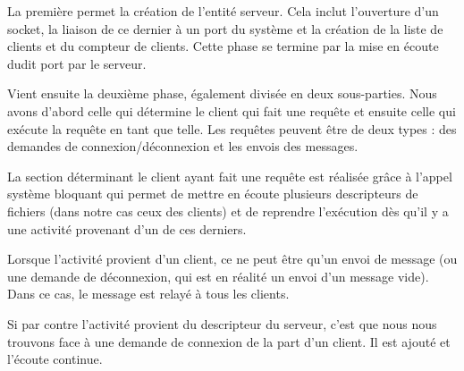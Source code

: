 La première permet la création de l'entité serveur. Cela
inclut l'ouverture d'un socket, la liaison de ce dernier à
un port du système et la création de la liste de clients et du
compteur de clients. Cette phase se termine par la mise en
écoute dudit port par le serveur.

Vient ensuite la deuxième phase, également divisée en deux
sous-parties. Nous avons d'abord celle qui détermine le
client qui fait une requête et ensuite celle qui exécute la requête
en tant que telle. Les requêtes peuvent être de deux types :
des demandes de connexion/déconnexion et les envois des
messages.

La section déterminant le client ayant fait une requête est
réalisée grâce à l'appel système bloquant \verb@select@ qui permet de
mettre en écoute plusieurs descripteurs de fichiers (dans
notre cas ceux des clients) et de reprendre l'exécution dès
qu'il y a une activité provenant d'un de ces derniers.

Lorsque l'activité provient d'un client, ce ne peut être
qu'un envoi de message (ou une demande de déconnexion, qui
est en réalité un envoi d'un message vide). Dans ce cas, le
message est relayé à tous les clients.

Si par contre l'activité provient du descripteur du serveur,
c'est que nous nous trouvons face à une demande de connexion de la
part d'un client. Il est ajouté et l'écoute continue.


